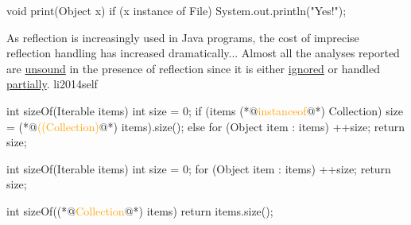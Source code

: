 \documentclass{article}
\begin{document}

\pptToc


\begin{lnSnippet}
void print(Object x) {
  if (x instance of File) {
    System.out.println("Yes!");
  }
}
\end{lnSnippet}

  {As reflection is increasingly used in Java programs, the cost of imprecise reflection handling has increased dramatically... Almost all the analyses reported are \ul{unsound} in the presence of reflection since it is either \ul{ignored} or handled \ul{partially}.}
  {li2014self}


\begin{lnSnippet}
int sizeOf(Iterable items) {
  int size = 0;
  if (items (*@\textcolor{orange}{instanceof}@*) Collection) {
    size = (*@\textcolor{orange}{((Collection)}@*) items).size();
  } else {
    for (Object item : items) {
      ++size;
    }
  }
  return size;
}
\end{lnSnippet}
\begin{lnSnippet}
int sizeOf(Iterable items) {
  int size = 0;
  for (Object item : items) {
    ++size;
  }
  return size;
}

int sizeOf((*@\textcolor{orange}{Collection}@*) items) {
  return items.size();
}
\end{lnSnippet}
\end{document}
